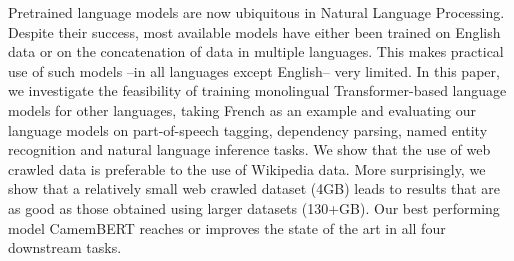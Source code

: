 Pretrained language models are now ubiquitous in Natural Language Processing. Despite their success, most available models have either been trained on English data or on the concatenation of data in multiple languages. This makes practical use of such models --in all languages except English-- very limited. In this paper, we investigate the feasibility of training monolingual Transformer-based language models for other languages, taking French as an example and evaluating our language models on part-of-speech tagging, dependency parsing, named entity recognition and natural language inference tasks. We show that the use of web crawled data is preferable to the use of Wikipedia data. More surprisingly, we show that a relatively small web crawled dataset (4GB) leads to results that are as good as those obtained using larger datasets (130+GB). Our best performing model CamemBERT reaches or improves the state of the art in all four downstream tasks.
